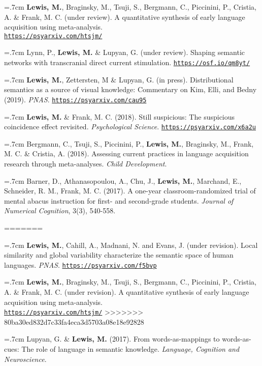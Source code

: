 \documentclass[letterpaper]{article}
\begin{document}
\hangindent=.7cm {\bf Lewis, M.}, Braginsky, M., Tsuji, S., Bergmann, C., Piccinini, P., Cristia, A. \& Frank, M. C. (under review). A quantitative synthesis of early language acquisition using meta-analysis. \\ \href{https://psyarxiv.com/htsjm/}{\tt https://psyarxiv.com/htsjm/}

\hangindent=.7cm Lynn, P., {\bf Lewis, M.} \& Lupyan, G. (under review). Shaping semantic networks with transcranial direct current stimulation. \href{https://osf.io/qm8yt/}{\tt https://osf.io/qm8yt/}

\hangindent=.7cm {\bf Lewis, M.}, Zettersten, M \& Lupyan, G. (in press).  Distributional semantics as a source of visual knowledge: Commentary on Kim, Elli, and Bedny (2019).  {\it PNAS}. \href{https://psyarxiv.com/cau95}{\tt https://psyarxiv.com/cau95}

\hangindent=.7cm {\bf Lewis, M.} \& Frank, M. C. (2018). Still suspicious: The suspicious coincidence effect revisited.  {\it Psychological Science}. \href{https://psyarxiv.com/x6a2u}{\tt https://psyarxiv.com/x6a2u}
  

\hangindent=.7cm Bergmann, C., Tsuji, S., Piccinini, P., {\bf Lewis, M.}, Braginsky, M., Frank, M. C. \& Cristia, A. (2018). Assessing current practices in language acquisition research through meta-analyses. {\it Child Development}.

\hangindent=.7cm Barner, D., Athanasopoulou, A., Chu, J., {\bf Lewis, M.}, Marchand, E., Schneider, R. M., Frank, M. C. (2017). A one-year classroom-randomized trial of mental abacus instruction for first- and second-grade students.  {\it Journal of Numerical Cognition}, 3(3), 540-558.
    
=======

\hangindent=.7cm {\bf Lewis, M.}, Cahill, A., Madnani, N. and Evans, J.  (under revision). Local similarity and global variability characterize the semantic space of human languages.   {\it PNAS}. \href{https://psyarxiv.com/f5bvp}{\tt https://psyarxiv.com/f5bvp}



\hangindent=.7cm {\bf Lewis, M.}, Braginsky, M., Tsuji, S., Bergmann, C., Piccinini, P., Cristia, A. \& Frank, M. C. (under revision). A quantitative synthesis of early language acquisition using meta-analysis. \\ \href{https://psyarxiv.com/htsjm/}{\tt  https://psyarxiv.com/htsjm/}
>>>>>>> 80ba30ed832d7c33fa4eca3d5703a08e18e92828

\hangindent=.7cm Lupyan, G. \& {\bf Lewis, M.} (2017). From words-as-mappings to words-as-cues: The role of language in semantic knowledge. {\it Language, Cognition and Neuroscience}.
\end{document}
